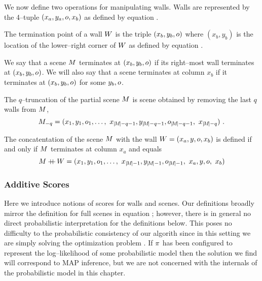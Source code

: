We now define two operations for manipulating walls. Walls are
represented by the 4--tuple $(x_a,y_a,\WallOrient,x_b)$ as defined by
equation .

\begin{definition}
  The termination point of a wall $\Wall$ is the triple
  $(x_b,y_b,\WallOrient)$ where $(x_b,y_b)$ is the location of the
  lower--right corner of $\Wall$ as defined by equation .

  We say that a scene $\Scene$ terminates at $(x_b,y_b,\WallOrient)$
  if its right--most wall terminates at $(x_b,y_b,\WallOrient)$. We will
  also say that a scene terminates at column $x_b$ if it terminates at
  $(x_b,y_b,\WallOrient)$ for some $y_b,\WallOrient$.
\end{definition}

\begin{definition}
  \label{def:truncation}
  The $q$--truncation of the partial scene $\PartialScene$ is scene obtained
  by removing the last $q$ walls from $\PartialScene$,
  \begin{equation}
    \PartialScene_{-q} = 
    ( x_1,y_1,\WallOrient_1,
    \ldots,
    ~x_{\SceneLen-q-1},y_{\SceneLen-q-1},\WallOrient_{\SceneLen-q-1},
    ~x_{\SceneLen-q} )~.
  \end{equation}
\end{definition}

\begin{definition}
  \label{def:concatentation}
  The concatentation of the scene $\PartialScene$ with the wall
  $\Wall=(x_a,y,\WallOrient,x_b)$ is defined if and only if
  $\PartialScene$ terminates at column $x_a$ and equals
  \begin{equation}
    \PartialScene \concat \Wall = 
    ( x_1,y_1,\WallOrient_1,
    \ldots,
    ~x_{\SceneLen-1},y_{\SceneLen-1},\WallOrient_{\SceneLen-1},
    ~x_a, y, \WallOrient, ~ x_b )
  \end{equation}
\end{definition}

\subsubsection{Additive Scores}

Here we introduce notions of scores for walls and scenes. Our
definitions broadly mirror the definition for full scenes in equation
; however, there is in general no direct
probabilistic interpretation for the definitions below. This poses no
difficulty to the probabilistic consistency of our algorith since in
this setting we are simply solving the optimization problem
. If $\PixelPayoff$ has been configured to represent
the log--likelihood of some probabilistic model then the solution we
find will correspond to MAP inference, but we are not concerned with
the internals of the probabilistic model in this chapter.


